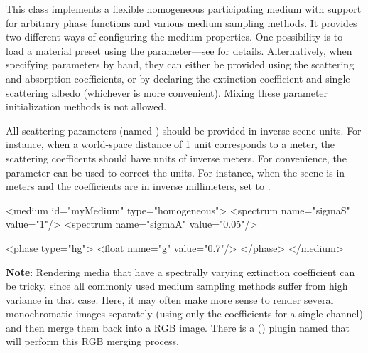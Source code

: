 This class implements a flexible homogeneous participating
medium with support for arbitrary phase functions and various
medium sampling methods. It provides two different ways of configuring
the medium properties. One possibility is to load a material preset
using the  parameter---see 
for details. Alternatively, when specifying parameters by hand, they can either
be provided using the scattering and absorption coefficients, or
by declaring the extinction coefficient and single scattering
albedo (whichever is more convenient). Mixing these parameter
initialization methods is not allowed.

All scattering parameters (named ) should
be provided in inverse scene units. For instance, when a world-space
distance of 1 unit corresponds to a meter, the scattering coefficents should
have units of inverse meters. For convenience, the 
parameter can be used to correct the units. For instance, when the scene is
in meters and the coefficients are in inverse millimeters, set
 to .


\begin{xml}[caption=Declaration of a forward scattering medium with high albedo]
<medium id="myMedium" type="homogeneous">
    <spectrum name="sigmaS" value="1"/>
    <spectrum name="sigmaA" value="0.05"/>

    <phase type="hg">
        <float name="g" value="0.7"/>
    </phase>
</medium>
\end{xml}

\textbf{Note}: Rendering media that have a spectrally
varying extinction coefficient can be tricky, since all
commonly used medium sampling methods suffer from high
variance in that case. Here, it may often make more sense to render
several monochromatic images separately (using only the coefficients for
a single channel) and then merge them back into a RGB image. There
is a  () plugin named 
that will perform this RGB merging process.

